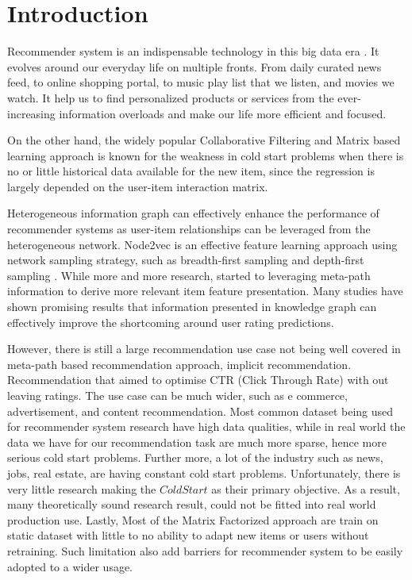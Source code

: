 \section{Introduction}

Recommender system is an indispensable technology in this big data era \cite{lu2015recommender}. It evolves around our everyday life on multiple fronts. From daily curated news feed, to online shopping portal, to music play list that we listen, and movies we watch. It help us to find personalized products or services from the ever-increasing information overloads and make our life more efficient and focused.

On the other hand, the widely popular Collaborative Filtering and Matrix based learning approach is known for the weakness in cold start problems when there is no or little historical data available for the new item, since the regression is largely depended on the user-item interaction matrix. 

Heterogeneous information graph can effectively enhance the performance of recommender systems as user-item relationships can be leveraged from the heterogeneous network\cite{hamilton2017representation}. Node2vec is an effective feature learning approach using network sampling strategy, such as breadth-first sampling and depth-first sampling \cite{grover2016node2vec}. While more and more research, started to leveraging meta-path information to derive more relevant item feature presentation. 
Many studies have shown promising results that information presented in knowledge graph can effectively improve the shortcoming \cite{hu2018leveraging} \cite{mao2016multirelational} \cite{wu2019comprehensive} around user rating predictions. 

However, there is still a large recommendation use case not being well covered in meta-path based recommendation approach, implicit recommendation. Recommendation that aimed to optimise CTR (Click Through Rate) with out leaving ratings. The use case can be much wider, such as e commerce, advertisement, and content recommendation. Most common dataset being used for recommender system research have high data qualities, while in real world the data we have for our recommendation task are much more sparse, hence more serious cold start problems. Further more, a lot of the industry such as news, jobs, real estate, are having constant cold start problems. Unfortunately, there is very little research making the $Cold Start$ as their primary objective. As a result, many theoretically sound research result, could not be fitted into real world production use. Lastly, Most of the Matrix Factorized approach are train on static dataset with little to no ability to adapt new items or users without retraining. Such limitation also add barriers for recommender system to be easily adopted to a wider usage.

